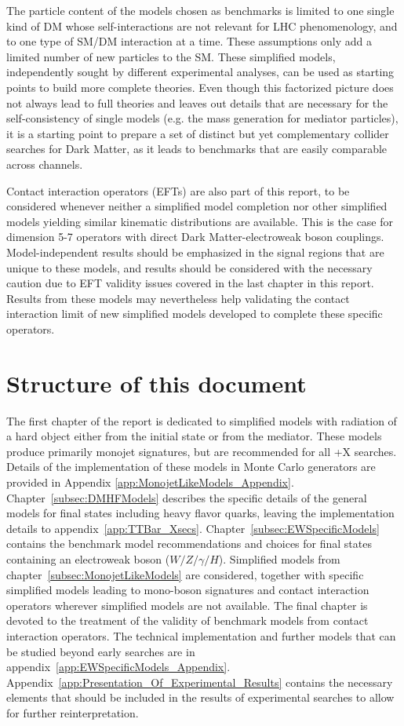 The particle content of the models chosen as benchmarks is limited to
one single kind of DM whose self-interactions are not relevant for LHC
phenomenology, and to one type of SM/DM interaction at a time. These
assumptions only add a limited number of new particles to the
SM. These simplified models, independently sought by different
experimental analyses, can be used as starting points to build more
complete theories. Even though this factorized picture does not always
lead to full theories and leaves out details that are necessary for
the self-consistency of single models (e.g. the mass generation for
mediator particles), it is a starting point to prepare a set of
distinct but yet complementary collider searches for Dark Matter, as
it leads to benchmarks that are easily comparable across channels.

Contact interaction operators (EFTs) are also part of this report, 
to be considered whenever neither a simplified model completion nor other simplified models 
yielding similar kinematic distributions are available. 
This is the case for dimension 5-7 operators with direct 
Dark Matter-electroweak boson couplings. 
Model-independent results should be emphasized 
in the signal regions that are unique to these models, 
and results should be considered with the necessary caution due to EFT 
validity issues covered in the last chapter in this report. 
Results from these models may nevertheless help validating the 
contact interaction limit of new simplified models developed to complete 
these specific operators. 

\section{Structure of this document}

The first chapter of the report is dedicated to simplified
models with radiation of a hard object either from the initial state
or from the mediator. These models produce primarily monojet signatures, 
but are recommended for all \MET{}+X searches.
Details of the implementation of these models in
Monte Carlo generators are provided in
Appendix \ref{app:MonojetLikeModels_Appendix}.
Chapter~\ref{subsec:DMHFModels} describes the specific details of the general models
for final states including heavy flavor quarks, leaving the implementation
details to appendix~\ref{app:TTBar_Xsecs}.  
Chapter~\ref{subsec:EWSpecificModels} contains the benchmark model
recommendations and choices for final states containing an electroweak 
boson ($W/Z/\gamma/H$). 
Simplified models from chapter~\ref{subsec:MonojetLikeModels}
are considered, together with specific simplified models leading to mono-boson signatures
and contact interaction operators wherever simplified models are not available. 
The final chapter is devoted to the treatment of the validity of benchmark
models from contact interaction operators.
The technical implementation and further models that can be studied
beyond early searches are in appendix~\ref{app:EWSpecificModels_Appendix}. 
Appendix~\ref{app:Presentation_Of_Experimental_Results} contains the necessary elements that
should be included in the results of experimental searches to allow for further reinterpretation. 

